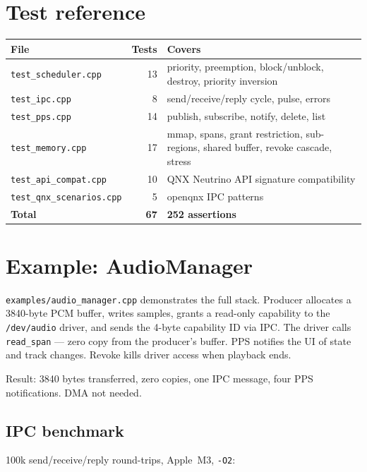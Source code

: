 \documentclass[11pt]{article}
\begin{document}
\section{Test reference}

\begin{longtable}{lrl}
\toprule
\textbf{File} & \textbf{Tests} & \textbf{Covers} \\
\midrule
\texttt{test\_scheduler.cpp} & 13 & priority, preemption, block/unblock, destroy, priority inversion \\
\texttt{test\_ipc.cpp} & 8 & send/receive/reply cycle, pulse, errors \\
\texttt{test\_pps.cpp} & 14 & publish, subscribe, notify, delete, list \\
\texttt{test\_memory.cpp} & 17 & mmap, spans, grant restriction, sub-regions, shared buffer, revoke cascade, stress \\
\texttt{test\_api\_compat.cpp} & 10 & QNX Neutrino API signature compatibility \\
\texttt{test\_qnx\_scenarios.cpp} & 5 & openqnx IPC patterns \\
\midrule
\textbf{Total} & \textbf{67} & \textbf{252 assertions} \\
\bottomrule
\end{longtable}

\section{Example: AudioManager}

\texttt{examples/audio\_manager.cpp} demonstrates the full stack.
Producer allocates a 3840-byte PCM buffer, writes samples,
grants a read-only capability to the \texttt{/dev/audio} driver,
and sends the 4-byte capability ID via IPC.  The driver calls
\texttt{read\_span} --- zero copy from the producer's buffer.
PPS notifies the UI of state and track changes.  Revoke kills
driver access when playback ends.

Result: 3840 bytes transferred, zero copies, one IPC message,
four PPS notifications.  DMA not needed.

\subsection{IPC benchmark}

100k send/receive/reply round-trips, Apple~M3, \texttt{-O2}:
\end{document}
